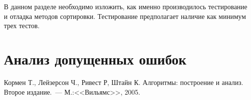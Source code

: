 \documentclass[a4paper,12pt,titlepage,finall]{article}
\begin{document}
В данном разделе необходимо изложить, как именно производилось тестирование
и отладка методов сортировки. Тестирование предполагает наличие как минимум
трех тестов.

\newpage

\section{Анализ допущенных ошибок}

\newpage
\begin{raggedright}
\begin{thebibliography}{99}
 Кормен Т., Лейзерсон Ч., Ривест Р, Штайн К. Алгоритмы: построение и анализ.
    Второе издание.~--- М.:<<Вильямс>>, 2005.
\end{thebibliography}
\end{raggedright}
\end{document}

